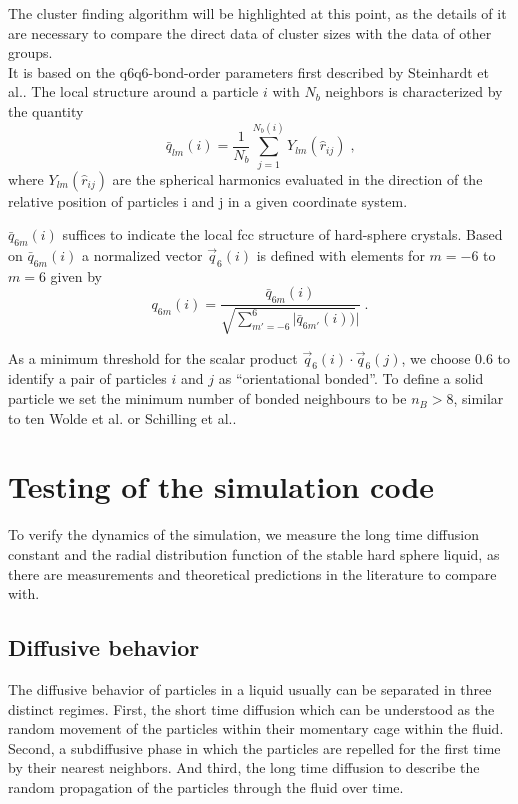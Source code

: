 The cluster finding algorithm will be highlighted at this point, as the details of it are necessary to compare the direct data of cluster sizes with the data of other groups.\\ 
It is based on the q6q6-bond-order parameters first described by Steinhardt et al.\cite{Steinhardt1983}.
The local structure around a particle $i$ with $N_b$ neighbors is characterized by the quantity
\begin{equation}
\label{eqn:local_q6}
\bar{q}_{lm}(i) = \frac{1}{N_b} \sum^{N_b (i)}_{j=1} Y_{lm} (\hat{r}_{ij}) \; \text{,}
\end{equation}
where $Y_{lm}(\hat{r}_{ij})$ are the spherical harmonics evaluated in the direction of the relative position of particles i and j in a given coordinate system.

$\bar{q}_{6m}(i)$ suffices to indicate the local fcc structure of hard-sphere crystals. Based on $\bar{q}_{6m}(i)$  a normalized vector $\vec{q}_{6}(i)$ is defined with elements for $m=-6$ to $m=6$ given by
\begin{equation}
q_{6m}(i) = \frac{\bar{q}_{6m}(i)}{ \sqrt{\sum_{m'=-6}^{6} |{\bar{q}_{6m'}(i)})}|  } \; \text{.}
\end{equation}

As a minimum threshold for the scalar product $\vec{q}_6(i) \cdot \vec{q}_6(j)$, we choose 0.6 to identify a pair of particles $i$ and $j$ as ``orientational bonded''. To define a solid particle we set the minimum number of bonded neighbours to be $n_B > 8$, similar to ten Wolde et al.\cite{TenWolde1995} or Schilling et al.\cite{Schilling2011}.

\section{Testing of the simulation code}
\label{sec:probe}
To verify the dynamics of the simulation, we measure the long time diffusion constant and the radial distribution function of the stable hard sphere liquid, as there are measurements and theoretical predictions in the literature to compare with.

\subsection{Diffusive behavior}
\label{sec:diffusion_probe}
The diffusive behavior of particles in a liquid usually can be separated in three distinct regimes. First, the short time diffusion which can be understood as the random movement of the particles within their momentary cage within the fluid. Second, a subdiffusive phase in which the particles are repelled for the first time by their nearest neighbors. And third, the long time diffusion to describe the random propagation of the particles through the fluid over time.\\
   

